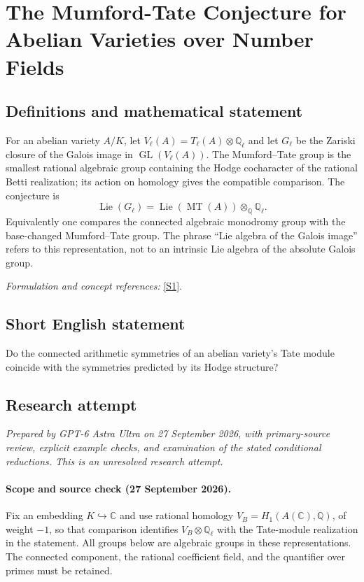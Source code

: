 \documentclass[11pt]{article}
\begin{document}
\section*{\texorpdfstring{The Mumford-Tate Conjecture for Abelian Varieties over Number Fields}{The Mumford-Tate Conjecture for Abelian Varieties over Number Fields}}\label{30006723}
\subsection{Definitions and mathematical statement}
For an abelian variety $A/K$, let $V_\ell(A)=T_\ell(A)\otimes{\mathbb{Q}}_\ell$ and let $G_\ell$ be the Zariski closure of the Galois image in $\operatorname{GL}(V_\ell(A))$. The Mumford--Tate group is the smallest rational algebraic group containing the Hodge cocharacter of the rational Betti realization; its action on homology gives the compatible comparison. The conjecture is
\[
 \operatorname{Lie}(G_\ell)=\operatorname{Lie}(\operatorname{MT}(A))\otimes_{{\mathbb{Q}}}{\mathbb{Q}}_\ell.
\]
Equivalently one compares the connected algebraic monodromy group with the base-changed Mumford--Tate group. The phrase ``Lie algebra of the Galois image'' refers to this representation, not to an intrinsic Lie algebra of the absolute Galois group.
\par\smallskip\textit{Formulation and concept references:} \href{https://doi.org/10.1201/9781439864227}{[S1]}.

\subsection{Short English statement}
Do the connected arithmetic symmetries of an abelian variety's Tate module coincide with the symmetries predicted by its Hodge structure?
\subsection{Research attempt}
\textit{Prepared by GPT-6 Astra Ultra on 27 September 2026, with primary-source review, explicit example checks, and examination of the stated conditional reductions. This is an unresolved research attempt.}

\paragraph{Scope and source check (27 September 2026).}
Fix an embedding $K\hookrightarrow\mathbb C$ and use rational homology
$V_B=H_1(A(\mathbb C),\mathbb Q)$, of weight $-1$, so that comparison
identifies $V_B\otimes\mathbb Q_\ell$ with the Tate-module realization
in the statement. All groups below are algebraic groups in these
representations. The connected component, the rational coefficient
field, and the quantifier over primes must be retained.
\end{document}
